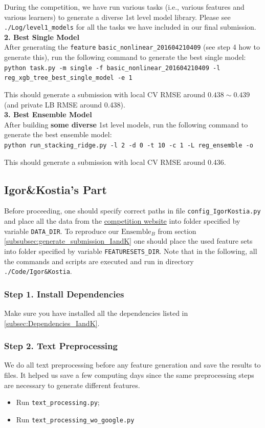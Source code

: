 \documentclass[12pt]{article}
\begin{document}
\begin{appendices}
During the competition, we have run various tasks (i.e., various features and various learners) to generate a diverse 1st level model library. Please see \texttt{./Log/level1\_models} for all the tasks we have included in our final submission.\\
\textbf{2. Best Single Model}\\
After generating the \texttt{feature} \texttt{basic\_nonlinear\_201604210409} (see step 4 how to generate this), run the following command to generate the best single model:\\
\texttt{python task.py -m single -f basic\_nonlinear\_201604210409 -l reg\_xgb\_tree\_best\_single\_model -e 1}

This should generate a submission with local CV RMSE around $0.438\sim 0.439$ (and private LB RMSE around 0.438).\\
\textbf{3. Best Ensemble Model}\\
After building \textbf{some diverse} 1st level models, run the following command to generate the best ensemble model:\\
\texttt{python run\_stacking\_ridge.py -l 2 -d 0 -t 10 -c 1 -L reg\_ensemble -o}

This should generate a submission with local CV RMSE around 0.436.




\subsection{Igor\&Kostia's Part}
Before proceeding, one should specify correct paths in file \texttt{config\_IgorKostia.py} and place all the data from the \href{https://www.kaggle.com/c/home-depot-product-search-relevance/dat}{competition website} into folder specified by variable \texttt{DATA\_DIR}.  To reproduce our $\text{Ensemble}_B$   from section \ref{subsubsec:generate_submission_IandK}  one should place the used feature sets into folder specified by variable \texttt{FEATURESETS\_DIR}. Note that in the following, all the commands and scripts are executed and run in directory \texttt{./Code/Igor\&Kostia}.

\subsubsection{Step 1. Install Dependencies}
Make sure you have installed all the dependencies listed in \ref{subsec:Dependencies_IandK}.

\subsubsection{Step 2. Text Preprocessing}
We do all text preprocessing before any feature generation and save the results to files. It helped us save a few computing days since the same preprocessing steps are necessary to generate different features.
\begin{itemize}
\item Run \texttt{text\_processing.py};
\item Run  \texttt{text\_processing\_wo\_google.py}
\end{itemize}


\end{appendices}
\end{document}
